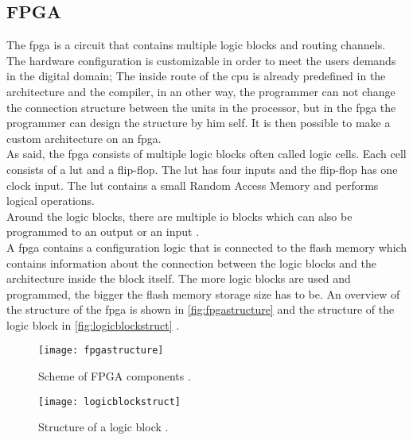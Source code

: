 \subsection{FPGA}


The \gls{fpga} is a circuit that contains multiple logic blocks and routing channels.\\
The hardware configuration is customizable in order to meet the users demands in the digital domain; The inside route of the \gls{cpu} is already predefined in the architecture and the compiler, in an other way, the programmer can not change the connection structure between the units in the processor, but in the \gls{fpga} the programmer can design the structure by him self. It is then possible to make a custom architecture on an \gls{fpga}.  \\
As said, the \gls{fpga} consists of multiple logic blocks often called logic cells. Each cell consists of a \gls{lut} and a flip-flop. The \gls{lut} has four inputs and the flip-flop has one clock input. The \gls{lut} contains a small Random Access Memory and performs logical operations. \\
Around the logic blocks, there are multiple \gls{io} blocks which can also be programmed to an output or an input \citep {FPGA_youtube} \citep{FPGA_center} \citep{FPGA_toronto}.  \\
A \gls{fpga} contains a configuration logic that is connected to the flash memory which contains information about the connection between the logic blocks and the architecture inside the block itself. The more logic blocks are used and programmed, the bigger the flash memory storage size has to be. An overview of the structure of the \gls{fpga} is shown in \autoref{fig:fpgastructure} and the structure of the logic block in \autoref{fig:logicblockstruct} \citep {FPGA_youtube} \citep{FPGA_center} \citep{FPGA_toronto}.  \\
\newline

\begin{figure}[htbp]
	\centering
	\texttt{[image: fpgastructure]}
	\caption{Scheme of FPGA components \citep{FPGA_toronto}.}
	\label{fig:fpgastructure}
\end{figure}

\begin{figure}[htbp]
	\centering
	\texttt{[image: logicblockstruct]}
	\caption{Structure of a logic block \citep{FPGA_toronto}.}
	\label{fig:logicblockstruct}
\end{figure}


